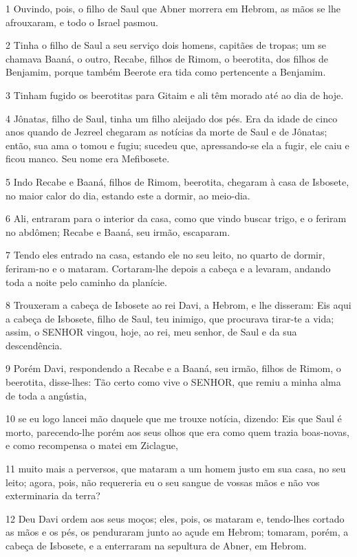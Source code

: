 \par 1 Ouvindo, pois, o filho de Saul que Abner morrera em Hebrom, as mãos se lhe afrouxaram, e todo o Israel pasmou.
\par 2 Tinha o filho de Saul a seu serviço dois homens, capitães de tropas; um se chamava Baaná, o outro, Recabe, filhos de Rimom, o beerotita, dos filhos de Benjamim, porque também Beerote era tida como pertencente a Benjamim.
\par 3 Tinham fugido os beerotitas para Gitaim e ali têm morado até ao dia de hoje.
\par 4 Jônatas, filho de Saul, tinha um filho aleijado dos pés. Era da idade de cinco anos quando de Jezreel chegaram as notícias da morte de Saul e de Jônatas; então, sua ama o tomou e fugiu; sucedeu que, apressando-se ela a fugir, ele caiu e ficou manco. Seu nome era Mefibosete.
\par 5 Indo Recabe e Baaná, filhos de Rimom, beerotita, chegaram à casa de Isbosete, no maior calor do dia, estando este a dormir, ao meio-dia.
\par 6 Ali, entraram para o interior da casa, como que vindo buscar trigo, e o feriram no abdômen; Recabe e Baaná, seu irmão, escaparam.
\par 7 Tendo eles entrado na casa, estando ele no seu leito, no quarto de dormir, feriram-no e o mataram. Cortaram-lhe depois a cabeça e a levaram, andando toda a noite pelo caminho da planície.
\par 8 Trouxeram a cabeça de Isbosete ao rei Davi, a Hebrom, e lhe disseram: Eis aqui a cabeça de Isbosete, filho de Saul, teu inimigo, que procurava tirar-te a vida; assim, o SENHOR vingou, hoje, ao rei, meu senhor, de Saul e da sua descendência.
\par 9 Porém Davi, respondendo a Recabe e a Baaná, seu irmão, filhos de Rimom, o beerotita, disse-lhes: Tão certo como vive o SENHOR, que remiu a minha alma de toda a angústia,
\par 10 se eu logo lancei mão daquele que me trouxe notícia, dizendo: Eis que Saul é morto, parecendo-lhe porém aos seus olhos que era como quem trazia boas-novas, e como recompensa o matei em Ziclague,
\par 11 muito mais a perversos, que mataram a um homem justo em sua casa, no seu leito; agora, pois, não requereria eu o seu sangue de vossas mãos e não vos exterminaria da terra?
\par 12 Deu Davi ordem aos seus moços; eles, pois, os mataram e, tendo-lhes cortado as mãos e os pés, os penduraram junto ao açude em Hebrom; tomaram, porém, a cabeça de Isbosete, e a enterraram na sepultura de Abner, em Hebrom.

